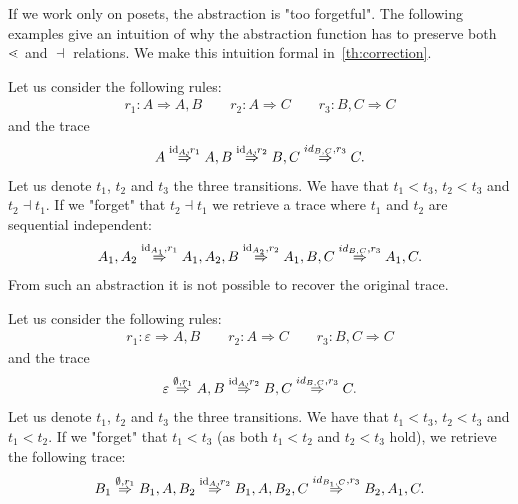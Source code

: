 If we work only on posets, the abstraction is "too forgetful".
The following examples give an intuition of why the abstraction function has to preserve both $\lessdot$ and $\dashv$ relations. We make this intuition formal in~\autoref{th:correction}.

\begin{example}
  Let us consider the following rules:
  \begin{align*}
    r_1:A \Rightarrow A, B\qquad r_2:A \Rightarrow C \qquad r_3: B,C \Rightarrow C
  \end{align*}
  and the trace
  \begin{align*}
    A \overset{\text{id}_A,r_1}{\Rightarrow} A, B \overset{\text{id}_A,r_2}{\Rightarrow} B,C \overset{id_{B,C},r_3}{\Rightarrow}C.
  \end{align*}
  Let us denote $t_1$, $t_2$ and $t_3$ the three transitions. We have that $t_1<t_3$, $t_2<t_3$ and $t_2\dashv t_1$. If we "forget" that $t_2\dashv t_1$ we retrieve a trace where $t_1$ and $t_2$ are sequential independent:
  \begin{align*}
    A_1,A_2 \overset{\text{id}_{A_1},r_1}{\Rightarrow} A_1,A_2,B \overset{\text{id}_{A_2},r_2}{\Rightarrow} A_1,B,C \overset{id_{B,C},r_3}{\Rightarrow} A_1,C.
  \end{align*}
  From such an abstraction it is not possible to recover the original trace.
\end{example}

\begin{example}
  Let us consider the following rules:
  \begin{align*}
    r_1:\varepsilon \Rightarrow A, B\qquad r_2:A \Rightarrow C \qquad r_3: B,C \Rightarrow C
  \end{align*}
  and the trace
  \begin{align*}
    \varepsilon \overset{\emptyset,r_1}{\Rightarrow} A, B \overset{\text{id}_A,r_2}{\Rightarrow} B,C \overset{id_{B,C},r_3}{\Rightarrow}C.
  \end{align*}
  Let us denote $t_1$, $t_2$ and $t_3$ the three transitions. We have that $t_1<t_3$, $t_2<t_3$ and $t_1< t_2$. If we "forget" that $t_1< t_3$ (as both $t_1<t_2$ and $t_2<t_3$ hold), we retrieve the following trace:
  \begin{align*}
    B_1 \overset{\emptyset,r_1}{\Rightarrow} B_1,A,B_2 \overset{\text{id}_{A},r_2}{\Rightarrow} B_1,A,B_2,C \overset{id_{B_1,C},r_3}{\Rightarrow} B_2,A_1,C.
  \end{align*}
\end{example}



